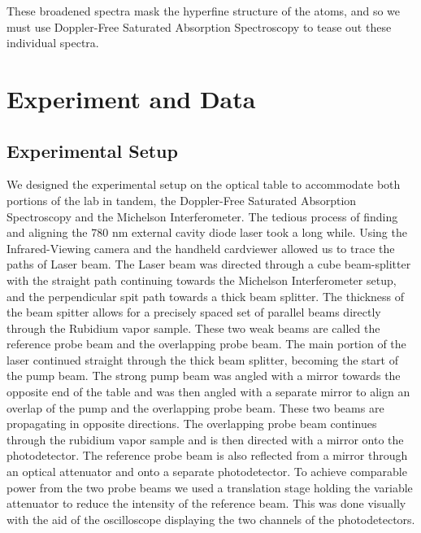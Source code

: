 \documentclass[12pt]{article}
\begin{document}
These broadened spectra mask the hyperfine structure of the atoms, and so we must use Doppler-Free Saturated Absorption Spectroscopy to tease out these individual spectra.



\section*{Experiment and Data}

\subsection*{Experimental Setup}
We designed the experimental setup on the optical table to accommodate both portions of the lab in tandem, the Doppler-Free Saturated Absorption Spectroscopy and the Michelson Interferometer. The tedious process of finding and aligning the 780 nm external cavity diode laser took a long while. Using the Infrared-Viewing camera and the handheld cardviewer allowed us to trace the paths of Laser beam. The Laser beam was directed through a cube beam-splitter with the straight path continuing towards the Michelson Interferometer setup, and the perpendicular spit path towards a thick beam splitter. The thickness of the beam spitter allows for a precisely spaced set of parallel beams directly through the Rubidium vapor sample. These two weak beams are called the reference probe beam and the overlapping probe beam. The main portion of the laser continued straight through the thick beam splitter, becoming the start of the pump beam. The strong pump beam was angled with a mirror towards the opposite end of the table and was then angled with a separate mirror to align an overlap of the pump and the overlapping probe beam. These two beams are propagating in opposite directions. The overlapping probe beam continues through the rubidium vapor sample and is then directed with a mirror onto the photodetector. The reference probe beam is also reflected from a mirror through an optical attenuator and onto a separate photodetector. To achieve comparable power from the two probe beams we used a translation stage holding the variable attenuator to reduce the intensity of the reference beam. This was done visually with the aid of the oscilloscope  displaying the two channels of the photodetectors. 
\end{document}
